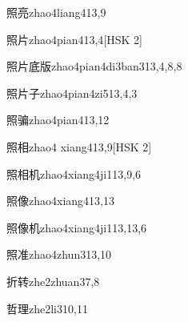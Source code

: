 \begin{entry}{照亮}{zhao4liang4}{13,9}
\end{entry}

\begin{entry}{照片}{zhao4pian4}{13,4}[HSK 2]
\end{entry}

\begin{entry}{照片底版}{zhao4pian4di3ban3}{13,4,8,8}
\end{entry}

\begin{entry}{照片子}{zhao4pian4zi5}{13,4,3}
\end{entry}

\begin{entry}{照骗}{zhao4pian4}{13,12}
\end{entry}

\begin{entry}{照相}{zhao4 xiang4}{13,9}[HSK 2]
\end{entry}

\begin{entry}{照相机}{zhao4xiang4ji1}{13,9,6}
\end{entry}

\begin{entry}{照像}{zhao4xiang4}{13,13}
\end{entry}

\begin{entry}{照像机}{zhao4xiang4ji1}{13,13,6}
\end{entry}

\begin{entry}{照准}{zhao4zhun3}{13,10}
\end{entry}

\begin{entry}{折转}{zhe2zhuan3}{7,8}
\end{entry}

\begin{entry}{哲理}{zhe2li3}{10,11}
\end{entry}

